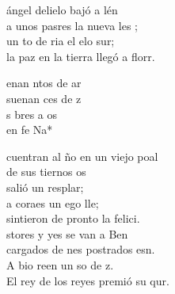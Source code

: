 \begin{cancion}%
	 ángel delielo bajó a lén\\
	a unos pasres la nueva les ; \\
	un to de ria el elo sur; \\
	la paz en la tierra llegó a florr.\jump\\
	\begin{chorus}%
		enan ntos de ar\\
		suenan ces de z\\
		 s bres a os\\
		en fe Na*\jump\\
	\end{chorus}%
	cuentran al ño en un viejo poal\\
	de sus tiernos os \\
	salió un resplar;\\
	a  coraes un ego lle; \\
	sintieron de pronto la felici.\\
	\jump
	stores y yes se van a Ben \\
	cargados de nes postrados esn.\\
	A bio reen un so de z.\\
	El rey de los reyes premió su qur.\\
\end{cancion}%
